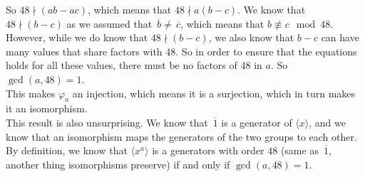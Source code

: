 \documentclass[12pt]{article}
\newcommand{\olsi}[1]{\,\overline{\!{#1}}}
\begin{document}
    So $48 \nmid (ab - ac)$,
    which means that $48 \nmid a(b - c)$.
    We know that $48 \nmid (b - c)$
    as we assumed that $\olsi{b} \neq \olsi{c}$,
    which means that $b \not\equiv c \mod 48$.
    However, while we do know that $48 \nmid (b - c)$,
    we also know that $b - c$ can have many values that
    share factors with 48.
    So in order to ensure that the equations holds for all these values,
    there must be no factors of 48 in $a$.
    So $\gcd(a, 48) = 1$. \\
    This makes $\varphi_a$ an injection,
    which means it is a surjection,
    which in turn makes it an isomorphism. \\
    This result is also unsurprising.
    We know that $\olsi{1}$ is a generator of $\langle x \rangle$,
    and we know that an isomorphism maps the generators of the
    two groups to each other.
    By definition, we know that $\langle x^a \rangle$
    is a generators with order $48$
    (same as $\olsi{1}$, another thing isomorphisms preserve)
    if and only if $\gcd(a, 48) = 1$.
\end{document}
